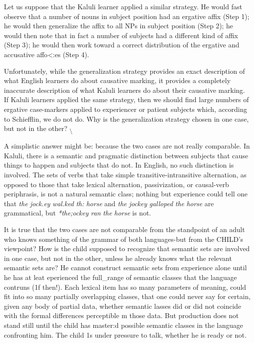 Let us suppose that the Kaluli learner applied a similar strategy. He would fast observe that a number of nouns in subject position had an ergative affix (Step 1); he would then generalize the affix to all NPs in subject position (Step 2); he would then note that in fact a number of subjects had a different kind of affix (Step 3); he would then work toward a correct distribution of the ergative and accusative affo{\textless}:es (Step 4).

Unfortunately, while the generalization strategy provides an exact description of what English learners do about causative marking, it provides a completely inaccurate description of what Kaluli learners do about their causative marking. If Kaluli learners applied the same strategy, then we should find large numbers of ergative case-markers applied to experiencer or patient subjects which, according to Schiefflin, we do not do. Why is the generalization strategy chosen in one case, but not in the other? \textsubscript{{\textbackslash}}


A simplistic answer might be: because the two cases are not really comparable. In Kaluli, there is a semantic and pragmatic distinc\-tion between subjects that cause things to happen and subjects that do not. In English, no such distinction is involved. The sets of verbs that take simple transitive-intransitive alternation, as opposed to those that take lexical alternation, passivization, or causal-verb periphrasis, is not a natural semantic class; nothing but experience could tell one that \textit{the} \textit{jock.}\textit{ey} \textit{wal.ked} \textit{th}\textit{:} \textit{horse} and \textit{the} \textit{jockey} \textit{galloped} \textit{the} \textit{horse} are gram\-matical, but \textit{*the;ockey} \textit{ran} \textit{the} \textit{horse} is not.

It is true that the two cases are not comparable from the stand\-point of an adult who knows something of the grammar of both lan\-guages-but from the CHILD's viewpoint? How is the child supposed to recognize that semantic sets are involved in one case, but not in the other, unless he already knows what the relevant semantic sets are? He cannot construct semantic sets from experience alone until he has at leat eperienced the full\_range of semantic classes that the language contruns (1f then!). Each lexical item has so many parameters of mean\-ing, could fit into so many partially overlapping classes, that one could never say for certain, given any body of partial data, whether semantic lasses did or did not coincide with the formal differences perceptible m those data. But production does not stand still until the child has master:d possible semantic classes in the language confronting him. The child 1s under pressure to talk, whether he is ready or not.

